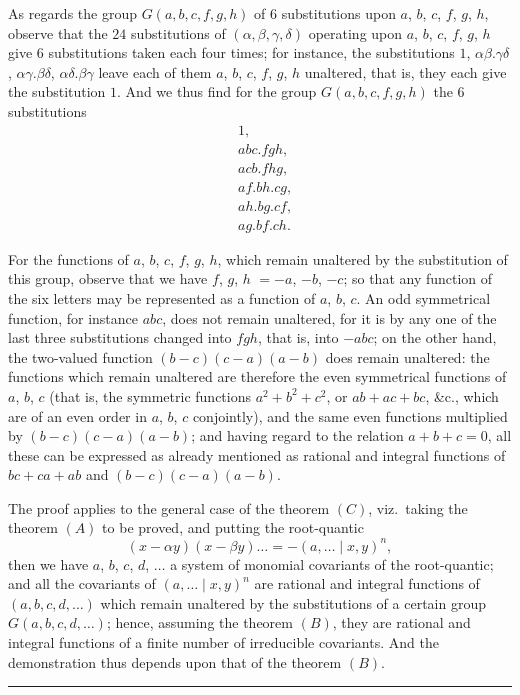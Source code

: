 \documentclass[11pt]{article}
\begin{document}
As regards the group $G(a, b, c, f, g, h)$ of $6$ substitutions upon $a$,
$b$, $c$, $f$, $g$, $h$, observe that the $24$ substitutions of $(\alpha,
\beta, \gamma, \delta)$ operating upon $a$, $b$, $c$, $f$, $g$, $h$ give $6$
substitutions taken each four times; for instance, the substitutions $1$,
$\alpha\beta . \gamma\delta$, $\alpha\gamma . \beta\delta$, $\alpha\delta .
\beta\gamma$ leave each of them $a$, $b$, $c$, $f$, $g$, $h$ unaltered, that
is, they each give the substitution $1$. And we thus find for the group
$G(a, b, c, f, g, h)$ the $6$ substitutions
\begin{align*}
  &1,\\
  &abc . fgh,\\
  &acb . fhg,\\
  &af . bh . cg,\\
  &ah . bg . cf,\\
  &ag . bf . ch.
\end{align*}

For the functions of $a$, $b$, $c$, $f$, $g$, $h$, which remain unaltered by
the substitution of this group, observe that we have $f$, $g$, $h$ $= -a$,
$-b$, $-c$; so that any function of the six letters may be represented as a
function of $a$, $b$, $c$. An odd symmetrical function, for instance $abc$,
does not remain unaltered, for it is by any one of the last three
substitutions changed into $fgh$, that is, into $-abc$; on the other hand,
the two-valued function $(b - c)(c - a)(a - b)$ does remain unaltered: the
functions which remain unaltered are therefore the even symmetrical
functions of $a$, $b$, $c$ (that is, the symmetric functions $a^{2} + b^{2}
+ c^{2}$, or $ab + ac + bc$, \&c., which are of an even order in $a$, $b$,
$c$ conjointly), and the same even functions multiplied by $(b - c)(c - a)
(a - b)$; and having regard to the relation $a + b + c = 0$, all these can
be expressed as already mentioned as rational and integral functions of
$bc + ca + ab$ and $(b - c)(c - a)(a - b)$.

The proof applies to the general case of the theorem $(C)$, viz.\ taking the
theorem $(A)$ to be proved, and putting the root-quantic
\[
  (x - \alpha y)(x - \beta y)\ldots = -(a, \ldots \mid x, y)^{n},
\]
then we have $a$, $b$, $c$, $d$, $\ldots$ a system of monomial covariants of
the root-quantic; and all the covariants of $(a, \ldots \mid x, y)^{n}$ are
rational and integral functions of $(a, b, c, d, \ldots)$ which remain
unaltered by the substitutions of a certain group $G(a, b, c, d, \ldots)$;
hence, assuming the theorem $(B)$, they are rational and integral functions
of a finite number of irreducible covariants. And the demonstration thus
depends upon that of the theorem $(B)$.

\bigskip
\noindent\rule{0.35\textwidth}{0.4pt}\\[2pt]
\end{document}
